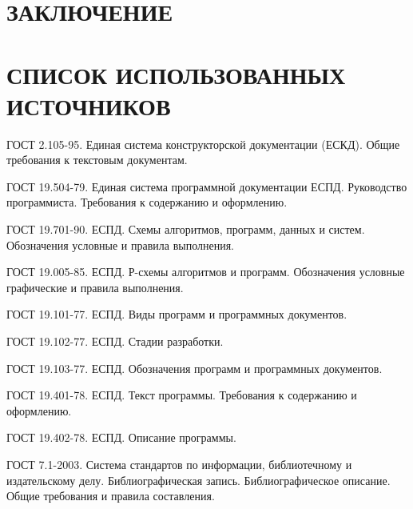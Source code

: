 \documentclass[12pt, a4paper, simple]{eskdtext}
\begin{document}
    \newpage

    \section*{ЗАКЛЮЧЕНИЕ}

    \newpage

    \begingroup
      \section*{СПИСОК ИСПОЛЬЗОВАННЫХ ИСТОЧНИКОВ}
    
      \renewcommand{\addcontentsline}[3]{}
      \renewcommand{\section}[2]{}
    
      \begin{thebibliography}{}
        ГОСТ 2.105-95.
        Единая система конструкторской документации (ЕСКД). 
        Общие требования к текстовым документам. 

        ГОСТ 19.504-79. 
        Единая система программной документации ЕСПД. Руководство программиста. 
        Требования к содержанию и оформлению.

        ГОСТ 19.701-90. ЕСПД. 
        Схемы алгоритмов, программ, данных и систем. 
        Обозначения условные и правила выполнения.

        ГОСТ 19.005-85. ЕСПД. 
        Р-схемы алгоритмов и программ. Обозначения условные графические и правила выполнения.

        ГОСТ 19.101-77. ЕСПД. 
        Виды программ и программных документов.

        ГОСТ 19.102-77. ЕСПД. 
        Стадии разработки.

        ГОСТ 19.103-77. ЕСПД.  
        Обозначения программ и программных документов. 

        ГОСТ 19.401-78. ЕСПД. 
        Текст программы. Требования к содержанию и оформлению.

        ГОСТ 19.402-78. ЕСПД. 
        Описание программы.

        ГОСТ 7.1-2003. Система стандартов по информации, библиотечному и издательскому делу. 
        Библиографическая запись. Библиографическое описание. 
        Общие требования и правила составления. 
      \end{thebibliography}
    \endgroup
    \newpage
\end{document}
